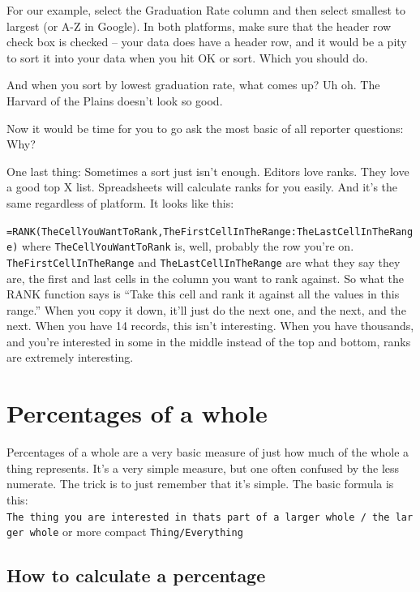 \documentclass[]{book}
\begin{document}
For our example, select the Graduation Rate column and then select smallest to largest (or A-Z in Google). In both platforms, make sure that the header row check box is checked -- your data does have a header row, and it would be a pity to sort it into your data when you hit OK or sort. Which you should do.

And when you sort by lowest graduation rate, what comes up? Uh oh. The Harvard of the Plains doesn't look so good.

Now it would be time for you to go ask the most basic of all reporter questions: Why?

One last thing: Sometimes a sort just isn't enough. Editors love ranks. They love a good top X list. Spreadsheets will calculate ranks for you easily. And it's the same regardless of platform. It looks like this:

\texttt{=RANK(TheCellYouWantToRank,TheFirstCellInTheRange:TheLastCellInTheRange)} where \texttt{TheCellYouWantToRank} is, well, probably the row you're on. \texttt{TheFirstCellInTheRange} and \texttt{TheLastCellInTheRange} are what they say they are, the first and last cells in the column you want to rank against. So what the RANK function says is ``Take this cell and rank it against all the values in this range.'' When you copy it down, it'll just do the next one, and the next, and the next. When you have 14 records, this isn't interesting. When you have thousands, and you're interested in some in the middle instead of the top and bottom, ranks are extremely interesting.

\hypertarget{percentages-of-a-whole}{%
\chapter{Percentages of a whole}\label{percentages-of-a-whole}}

Percentages of a whole are a very basic measure of just how much of the whole a thing represents. It's a very simple measure, but one often confused by the less numerate. The trick is to just remember that it's simple. The basic formula is this: \texttt{The\ thing\ you\ are\ interested\ in\ that\textquotesingle{}s\ part\ of\ a\ larger\ whole\ /\ the\ larger\ whole} or more compact \texttt{Thing/Everything}

\hypertarget{how-to-calculate-a-percentage}{%
\section{How to calculate a percentage}\label{how-to-calculate-a-percentage}}
\end{document}
